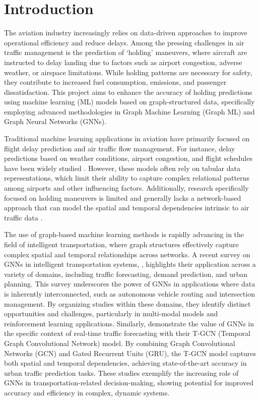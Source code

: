 \chapter[Introduction]{Introduction}
\label{Introdução}

\noindent The aviation industry increasingly relies on data-driven approaches to improve operational efficiency and reduce delays. Among the pressing challenges in air traffic management is the prediction of `holding' maneuvers, where aircraft are instructed to delay landing due to factors such as airport congestion, adverse weather, or airspace limitations. While holding patterns are necessary for safety, they contribute to increased fuel consumption, emissions, and passenger dissatisfaction. This project aims to enhance the accuracy of holding predictions using machine learning (ML) models based on graph-structured data, specifically employing advanced methodologies in Graph Machine Learning (Graph ML) and Graph Neural Networks (GNNs).

Traditional machine learning applications in aviation have primarily focused on flight delay prediction and air traffic flow management. For instance, delay predictions based on weather conditions, airport congestion, and flight schedules have been widely studied \cite{lambelho2020assessing, gui2019flight}. However, these models often rely on tabular data representations, which limit their ability to capture complex relational patterns among airports and other influencing factors. Additionally, research specifically focused on holding maneuvers is limited and generally lacks a network-based approach that can model the spatial and temporal dependencies intrinsic to air traffic data \cite{lee2020development, smith2008management}.

The use of graph-based machine learning methods is rapidly advancing in the field of intelligent transportation, where graph structures effectively capture complex spatial and temporal relationships across networks. A recent survey on GNNs in intelligent transportation systems,  , highlights their application across a variety of domains, including traffic forecasting, demand prediction, and urban planning. This survey underscores the power of GNNs in applications where data is inherently interconnected, such as autonomous vehicle routing and intersection management. By organizing studies within these domains, they identify distinct opportunities and challenges, particularly in multi-modal models and reinforcement learning applications. Similarly,  demonstrate the value of GNNs in the specific context of real-time traffic forecasting with their T-GCN (Temporal Graph Convolutional Network) model. By combining Graph Convolutional Networks (GCN) and Gated Recurrent Units (GRU), the T-GCN model captures both spatial and temporal dependencies, achieving state-of-the-art accuracy in urban traffic prediction tasks. These studies exemplify the increasing role of GNNs in transportation-related decision-making, showing potential for improved accuracy and efficiency in complex, dynamic systems.

